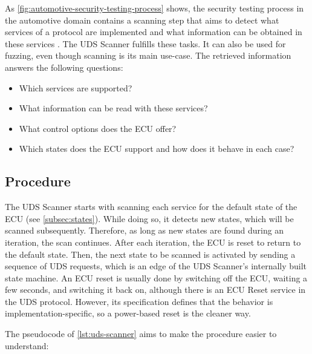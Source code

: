 As \autoref{fig:automotive-security-testing-process} shows, the security testing process in the automotive domain contains a scanning step that aims to detect what services of a protocol are implemented and what information can be obtained in these services \cite{Bayer2015}. The UDS Scanner fulfills these tasks. It can also be used for fuzzing, even though scanning is its main use-case. The retrieved information answers the following questions:

\begin{itemize}
\item Which services are supported?
\item What information can be read with these services?
\item What control options does the ECU offer?
\item Which states does the ECU support and how does it behave in each case?
\end{itemize}


\subsection{Procedure}

The UDS Scanner starts with scanning each service for the default state of the ECU (see \autoref{subsec:states}). While doing so, it detects new states, which will be scanned subsequently. Therefore, as long as new states are found during an iteration, the scan continues. After each iteration, the ECU is reset to return to the default state. Then, the next state to be scanned is activated by sending a sequence of UDS requests, which is an edge of the UDS Scanner's internally built state machine. An ECU reset is usually done by switching off the ECU, waiting a few seconds, and switching it back on, although there is an ECU Reset service in the UDS protocol. However, its specification defines that the behavior is implementation-specific, so a power-based reset is the cleaner way.

The pseudocode of \autoref{lst:uds-scanner} aims to make the procedure easier to understand:

